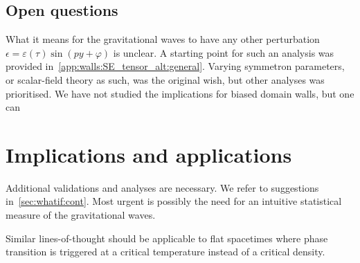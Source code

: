     
 


    \subsection{Open questions}
    What it means for the gravitational waves to have any other perturbation $\epsilon= \varepsilon(\tau) \sin{(py + \varphi)}$ is unclear. A starting point for such an analysis was provided in~\cref{app:walls:SE_tensor_alt:general}. Varying symmetron parameters, or scalar-field theory as such, was the original wish, but other analyses was prioritised. 
    We have not studied the implications for biased domain walls, but one can  \blahblah 


    




\section{Implications and applications}
    Additional validations and analyses are necessary. We refer to suggestions in~\cref{sec:whatif:cont}. 
    Most urgent is possibly the need for an intuitive statistical measure of the gravitational waves. 



    Similar lines-of-thought should be applicable to flat spacetimes where phase transition is triggered at a critical temperature instead of a critical density. 
    
    





